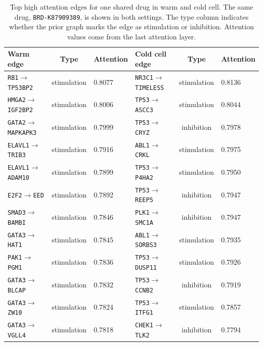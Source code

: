 \begin{table}[htbp]
\centering
\caption[Shared Drug Edges]{Top high attention edges for one shared drug in warm and cold cell. The same drug, \texttt{BRD-K87909389}, is shown in both settings. The type column indicates whether the prior graph marks the edge as stimulation or inhibition. Attention values come from the last attention layer.}
\label{tab:attention_shared_drug_warm_cold_cell}
\begin{tabular}{lcllcl}
\hline
Warm edge & Type & Attention & Cold cell edge & Type & Attention \\
\hline
\texttt{RB1}$\rightarrow$\texttt{TP53BP2} & stimulation & 0.8077 & \texttt{NR3C1}$\rightarrow$\texttt{TIMELESS} & stimulation & 0.8136 \\
\texttt{HMGA2}$\rightarrow$\texttt{IGF2BP2} & stimulation & 0.8006 & \texttt{TP53}$\rightarrow$\texttt{ASCC3} & stimulation & 0.8044 \\
\texttt{GATA2}$\rightarrow$\texttt{MAPKAPK3} & stimulation & 0.7999 & \texttt{TP53}$\rightarrow$\texttt{CRYZ} & inhibition & 0.7978 \\
\texttt{ELAVL1}$\rightarrow$\texttt{TRIB3} & stimulation & 0.7916 & \texttt{ABL1}$\rightarrow$\texttt{CRKL} & stimulation & 0.7975 \\
\texttt{ELAVL1}$\rightarrow$\texttt{ADAM10} & stimulation & 0.7899 & \texttt{TP53}$\rightarrow$\texttt{P4HA2} & stimulation & 0.7950 \\
\texttt{E2F2}$\rightarrow$\texttt{EED} & stimulation & 0.7892 & \texttt{TP53}$\rightarrow$\texttt{REEP5} & inhibition & 0.7947 \\
\texttt{SMAD3}$\rightarrow$\texttt{BAMBI} & stimulation & 0.7846 & \texttt{PLK1}$\rightarrow$\texttt{SMC1A} & inhibition & 0.7947 \\
\texttt{GATA3}$\rightarrow$\texttt{HAT1} & stimulation & 0.7845 & \texttt{ABL1}$\rightarrow$\texttt{SORBS3} & stimulation & 0.7935 \\
\texttt{PAK1}$\rightarrow$\texttt{PGM1} & stimulation & 0.7836 & \texttt{TP53}$\rightarrow$\texttt{DUSP11} & stimulation & 0.7926 \\
\texttt{GATA3}$\rightarrow$\texttt{BLCAP} & stimulation & 0.7832 & \texttt{TP53}$\rightarrow$\texttt{CCNB2} & inhibition & 0.7919 \\
\texttt{GATA3}$\rightarrow$\texttt{ZW10} & stimulation & 0.7824 & \texttt{TP53}$\rightarrow$\texttt{ITFG1} & stimulation & 0.7857 \\
\texttt{GATA3}$\rightarrow$\texttt{VGLL4} & stimulation & 0.7818 & \texttt{CHEK1}$\rightarrow$\texttt{TLK2} & inhibition & 0.7794 \\

\end{tabular}
\end{table}
